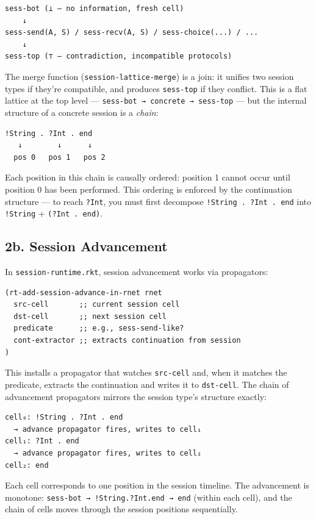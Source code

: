 \documentclass[11pt]{article}
\begin{document}
\begin{verbatim}
sess-bot (⊥ — no information, fresh cell)
    ↓
sess-send(A, S) / sess-recv(A, S) / sess-choice(...) / ...
    ↓
sess-top (⊤ — contradiction, incompatible protocols)
\end{verbatim}

The merge function (\texttt{session-lattice-merge}) is a join: it unifies two session
types if they're compatible, and produces \texttt{sess-top} if they conflict. This is
a flat lattice at the top level — \texttt{sess-bot → concrete → sess-top} — but the
internal structure of a concrete session is a \emph{chain}:

\begin{verbatim}
!String . ?Int . end
   ↓        ↓      ↓
  pos 0   pos 1   pos 2
\end{verbatim}

Each position in this chain is causally ordered: position 1 cannot occur until
position 0 has been performed. This ordering is enforced by the continuation
structure — to reach \texttt{?Int}, you must first decompose \texttt{!String . ?Int . end}
into \texttt{!String} + \texttt{(?Int . end)}.
\subsection{2b. Session Advancement}
\label{sec:orgf61c9cc}

In \texttt{session-runtime.rkt}, session advancement works via propagators:

\begin{verbatim}
(rt-add-session-advance-in-rnet rnet
  src-cell       ;; current session cell
  dst-cell       ;; next session cell
  predicate      ;; e.g., sess-send-like?
  cont-extractor ;; extracts continuation from session
)
\end{verbatim}

This installs a propagator that watches \texttt{src-cell} and, when it matches the
predicate, extracts the continuation and writes it to \texttt{dst-cell}. The chain
of advancement propagators mirrors the session type's structure exactly:

\begin{verbatim}
cell₀: !String . ?Int . end
  → advance propagator fires, writes to cell₁
cell₁: ?Int . end
  → advance propagator fires, writes to cell₂
cell₂: end
\end{verbatim}

Each cell corresponds to one position in the session timeline. The advancement
is monotone: \texttt{sess-bot → !String.?Int.end → end} (within each cell), and the
chain of cells moves through the session positions sequentially.
\end{document}
